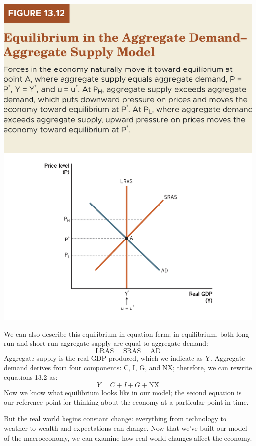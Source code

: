 \documentclass[11pt]{article} %
\begin{document}
\begin{center}
\includegraphics[scale=0.35]{images/Figure 13.12.png} 
\end{center}

We can also describe this equilibrium in equation form; in equilibrium, both long-run and short-run aggregate supply are equal to aggregate demand:
\begin{equation}
\text{LRAS}=\text{SRAS}=\text{AD}
\end{equation}
Aggregate supply is the real GDP produced, which we indicate as Y. Aggregate demand derives from four components: C, I, G, and NX; therefore, we can rewrite equations 13.2 as:
\begin{equation}
Y=C+I+G+\text{NX}
\end{equation}
Now we know what equilibrium looks like in our model; the second equation is our reference point for thinking about the economy at a particular point in time.

But the real world begins constant change: everything from technology to weather to wealth and expectations can change. Now that we've built our model of the macroeconomy, we can examine how real-world changes affect the economy.
\end{document}
